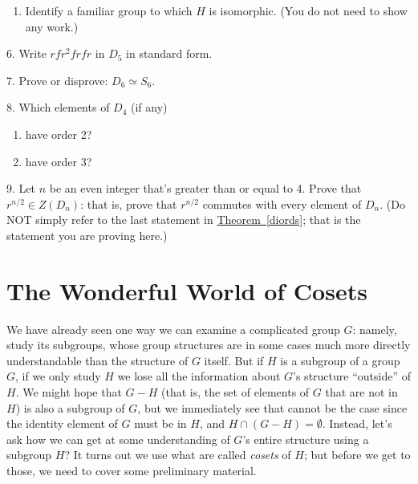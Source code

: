 \documentclass[10pt,openany,oneside]{book}
\theoremstyle{plain}
\theoremstyle{definition}
\theoremstyle{definition}
\theoremstyle{definition}
\theoremstyle{definition}
\numberwithin{equation}{section}
\begin{document}
\begin{exerciselist}
\begin{enumerate}[label=(\alph*)]
\item\hypertarget{li-378}{}Identify a familiar group to which \(H\) is isomorphic. (You do not need to show any work.)%
\end{enumerate}
%
\par\smallskip
\item[6.]\hypertarget{exercise-46}{}Write \(rfr^2frfr\) in \(D_5\) in standard form.%
\par\smallskip
\item[7.]\hypertarget{exercise-47}{}Prove or disprove: \(D_6\simeq S_6\).%
\par\smallskip
\item[8.]\hypertarget{exercise-48}{}Which elements of \(D_4\) (if any) \leavevmode%
\begin{enumerate}[label=(\alph*)]
\item\hypertarget{li-381}{}have order 2?%
\item\hypertarget{li-382}{}have order \(3\)?%
\end{enumerate}
%
\par\smallskip
\item[9.]\hypertarget{exercise-49}{}Let \(n\) be an even integer that's greater than or equal to 4. Prove that \(r^{n/2}\in Z(D_n)\): that is, prove that \(r^{n/2}\) commutes with every element of \(D_n\). (Do NOT simply refer to the last statement in \hyperref[diords]{Theorem~\ref{diords}}; that is the statement you are proving here.)%
\par\smallskip
\end{exerciselist}
\typeout{************************************************}
\typeout{************************************************}
\chapter[{The Wonderful World of Cosets}]{The Wonderful World of Cosets}\label{coslag}
We have already seen one way we can examine a complicated group \(G\): namely, study its subgroups, whose group structures are in some cases much more directly understandable than the structure of \(G\) itself. But if \(H\) is a subgroup of a group \(G\), if we only study \(H\) we lose all the information about \(G\)'s structure ``outside'' of \(H\). We might hope that \(G-H\) (that is, the set of elements of \(G\) that are not in \(H\)) is also a subgroup of \(G\), but we immediately see that cannot be the case since the identity element of \(G\) must be in \(H\), and \(H\cap (G-H)=\emptyset\). Instead, let's ask how we can get at some understanding of \(G\)'s entire structure using a subgroup \(H\)? It turns out we use what are called \emph{cosets} of \(H\); but before we get to those, we need to cover some preliminary material.%
\typeout{************************************************}
\typeout{************************************************}
\end{document}
